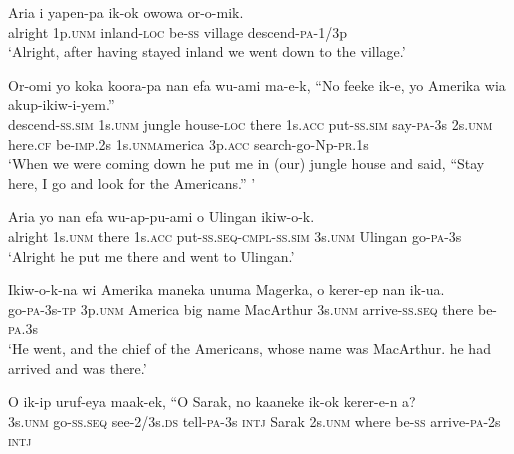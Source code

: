 \ea\label{ex:a:x104}
\gll  Aria  i  yapen-pa  ik-ok  owowa  or-o-mik. \\
alright  1p.\textsc{unm}  inland-\textsc{loc}  be-\textsc{ss}  village  descend-\textsc{pa}-1/3p \\
\glt ‘Alright, after having stayed inland we went down to the village.’ \\
\z


\ea\label{ex:a:x105}
\gll  Or-omi  yo  koka  koora-pa  nan  efa               wu-ami  ma-e-k,  “No  feeke  ik-e,  yo  Amerika                   wia  akup-ikiw-i-yem.” \\
descend-\textsc{ss}.\textsc{sim}  1s.\textsc{unm}  jungle  house-\textsc{loc}  there  1s.\textsc{acc} put-\textsc{ss}.\textsc{sim}  say-\textsc{pa}-3s  2s.\textsc{unm}  here.\textsc{cf}  be-\textsc{imp}.2s  1s.\textsc{unma}merica  3p.\textsc{acc}  search-go-Np-\textsc{pr}.1s \\




\glt ‘When we were coming down he put me in (our) jungle house and said, “Stay here, I go and look for the Americans.” ’ \\
\z


\ea\label{ex:a:x106}
\gll  Aria  yo  nan  efa  wu-ap-pu-ami                  o  Ulingan  ikiw-o-k. \\
alright  1s.\textsc{unm}  there  1s.\textsc{acc}  put-\textsc{ss.seq}-\textsc{cmpl}-\textsc{ss}.\textsc{sim}  3s.\textsc{unm}  Ulingan  go-\textsc{pa}-3s \\


\glt ‘Alright he put me there and went to Ulingan.’ \\
\z


\ea\label{ex:a:x107}
\gll  Ikiw-o-k-na  wi  Amerika  maneka  unuma  Magerka,  o  kerer-ep  nan  ik-ua. \\
go-\textsc{pa}-3s-\textsc{tp}  3p.\textsc{unm}  America  big  name  MacArthur       3s.\textsc{unm}  arrive-\textsc{ss.seq}  there  be-\textsc{pa}.3s \\


\glt ‘He went, and the chief of the Americans, whose name was MacArthur. he had arrived and was there.’ \\
\z


\ea\label{ex:a:x108}
\gll  O  ik-ip  uruf-eya  maak-ek,  ``O  Sarak,  no    kaaneke  ik-ok  kerer-e-n  a? \\
3s.\textsc{unm}  go-\textsc{ss.seq}  see-2/3s.\textsc{ds}  tell-\textsc{pa}-3s  \textsc{intj}  Sarak  2s.\textsc{unm}     where  be-\textsc{ss}  arrive-\textsc{pa}-2s  \textsc{intj} \\


